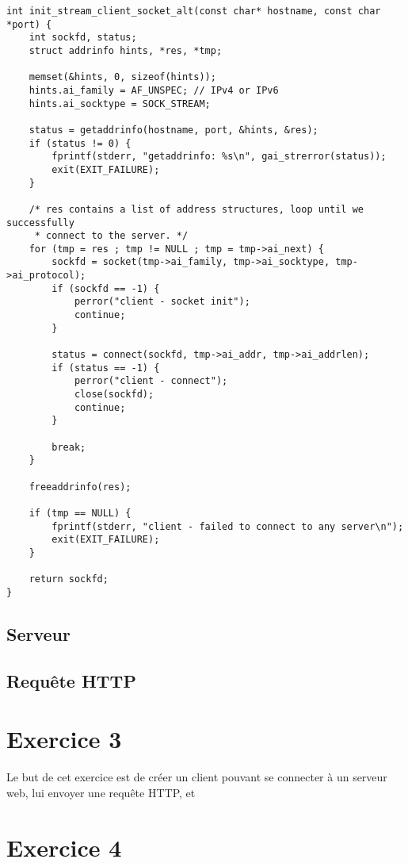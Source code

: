 \documentclass[a4paper, frenchb, 11pt]{article}
\begin{document}
\begin{lstlisting}
int init_stream_client_socket_alt(const char* hostname, const char *port) {
    int sockfd, status;
    struct addrinfo hints, *res, *tmp;

    memset(&hints, 0, sizeof(hints));
    hints.ai_family = AF_UNSPEC; // IPv4 or IPv6
    hints.ai_socktype = SOCK_STREAM;

    status = getaddrinfo(hostname, port, &hints, &res);
    if (status != 0) {
        fprintf(stderr, "getaddrinfo: %s\n", gai_strerror(status));
        exit(EXIT_FAILURE);
    }

    /* res contains a list of address structures, loop until we successfully
     * connect to the server. */
    for (tmp = res ; tmp != NULL ; tmp = tmp->ai_next) {
        sockfd = socket(tmp->ai_family, tmp->ai_socktype, tmp->ai_protocol);
        if (sockfd == -1) {
            perror("client - socket init");
            continue;
        }

        status = connect(sockfd, tmp->ai_addr, tmp->ai_addrlen);
        if (status == -1) {
            perror("client - connect");
            close(sockfd);
            continue;
        }

        break;
    }

    freeaddrinfo(res);

    if (tmp == NULL) {
        fprintf(stderr, "client - failed to connect to any server\n");
        exit(EXIT_FAILURE);
    }

    return sockfd;
}
\end{lstlisting}

\subsection{Serveur}

\subsection{Requête HTTP}

\newpage

\section{Exercice 3}
Le but de cet exercice est de créer un client pouvant se connecter à un serveur web, lui envoyer une requête HTTP, et %
\newpage

\section{Exercice 4}
\end{document}
